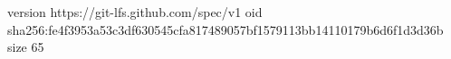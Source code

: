 version https://git-lfs.github.com/spec/v1
oid sha256:fe4f3953a53c3df630545cfa817489057bf1579113bb14110179b6d6f1d3d36b
size 65
